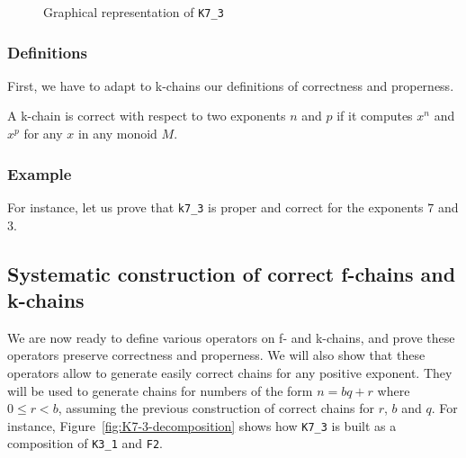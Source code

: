 \begin{figure}[h]
  \centering
  \caption{Graphical representation of \texttt{K7\_3}}
  \label{fig:K7-3-as-dag}
\end{figure}


\subsubsection{Definitions}

First, we have to adapt to k-chains our definitions of correctness and properness.




A k-chain is correct with respect to two exponents $n$ and $p$ 
  if it computes $x ^ n$ and $x ^ p$ for any $x$ in any monoid $M$.

  
\subsubsection{Example}
For instance, let us prove that \texttt{k7\_3} is proper and correct for the exponents  $7$ and $3$.


\subsection{Systematic construction of  correct f-chains and k-chains}

We are now ready to define various operators on f- and k-chains, and prove these
operators preserve correctness and properness. We will also show that
these operators allow to generate easily correct chains for any positive 
exponent. They will be used to generate chains for
numbers of the form $n=bq+r$ where $0\leq r < b$, assuming the previous
construction of correct chains for $r$, $b$ and $q$.
For instance, Figure~\ref{fig:K7-3-decomposition} shows how \texttt{K7\_3} is built
as a composition of \texttt{K3\_1} and \texttt{F2}.



